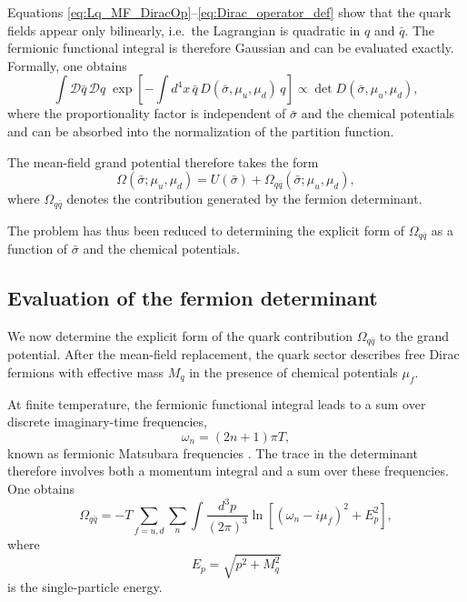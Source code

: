 Equations \eqref{eq:Lq_MF_DiracOp}--\eqref{eq:Dirac_operator_def} show
that the quark fields appear only bilinearly, i.e.\ the Lagrangian is
quadratic in $q$ and $\bar q$. The fermionic functional integral is
therefore Gaussian and can be evaluated exactly. Formally, one obtains
\cite{PeskinSchroeder1995,WeinbergQFT}
\begin{equation}
\int \mathcal{D}\bar q\,\mathcal{D}q\;
\exp\!\left[-\int d^4x\,\bar q\,D(\bar{\sigma},\mu_u,\mu_d)\,q\right]
\propto
\det D(\bar{\sigma},\mu_u,\mu_d),
\label{eq:fermion_gaussian_det}
\end{equation}
where the proportionality factor is independent of $\bar{\sigma}$ and
the chemical potentials and can be absorbed into the normalization of
the partition function.

The mean-field grand potential therefore takes the form
\begin{equation}
\Omega(\bar{\sigma};\mu_u,\mu_d)
=
U(\bar{\sigma})
+
\Omega_{q\bar q}(\bar{\sigma};\mu_u,\mu_d) ,
\label{eq:Omega_MF_structure}
\end{equation}
where $\Omega_{q\bar q}$ denotes the contribution generated by the
fermion determinant.

The problem has thus been reduced to determining the explicit form of
$\Omega_{q\bar q}$ as a function of $\bar{\sigma}$ and the chemical
potentials.

\subsection*{Evaluation of the fermion determinant}
\label{subsec:fermion_determinant}

We now determine the explicit form of the quark contribution
$\Omega_{q\bar q}$ to the grand potential.
After the mean-field replacement, the quark sector describes free
Dirac fermions with effective mass $M_q$
in the presence of chemical potentials $\mu_f$.

At finite temperature, the fermionic functional integral leads to
a sum over discrete imaginary-time frequencies,
\begin{equation}
\omega_n = (2n+1)\pi T ,
\end{equation}
known as fermionic Matsubara frequencies
\cite{Matsubara1955,KapustaGale}.
The trace in the determinant therefore involves both a momentum
integral and a sum over these frequencies.
One obtains
\begin{equation}
\Omega_{q\bar q}
=
- T \sum_{f=u,d}
\sum_{n}
\int \frac{d^3 p}{(2\pi)^3}
\ln\!\left[
(\omega_n - i\mu_f)^2 + E_p^2
\right],
\label{eq:Omega_Matsubara}
\end{equation}
where
\begin{equation}
E_p = \sqrt{p^2 + M_q^2}
\end{equation}
is the single-particle energy.

